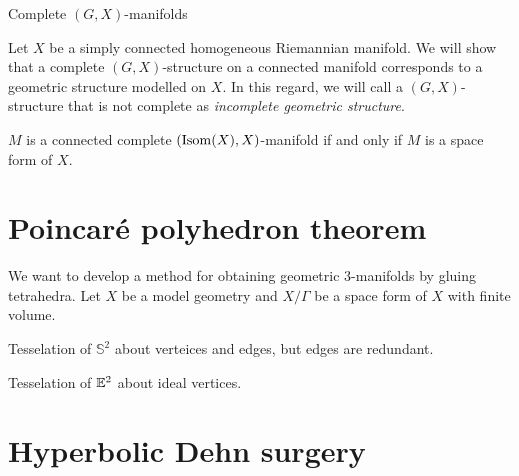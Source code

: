 \documentclass{../../large}
\begin{document}
\begin{prb}
Complete $(G,X)$-manifolds
\end{prb}

\begin{prb}
Let $X$ be a simply connected homogeneous Riemannian manifold.
We will show that a complete $(G,X)$-structure on a connected manifold corresponds to a geometric structure modelled on $X$.
In this regard, we will call a $(G,X)$-structure that is not complete as \emph{incomplete geometric structure}.
\begin{parts}
\item $M$ is a connected complete $(\operatorname{Isom}(X),X)$-manifold if and only if $M$ is a space form of $X$.
\end{parts}
\end{prb}



\section{Poincar\'e polyhedron theorem}

\begin{prb}
\end{prb}

\begin{prb}
We want to develop a method for obtaining geometric 3-manifolds by gluing tetrahedra.
Let $X$ be a model geometry and $X/\Gamma$ be a space form of $X$ with finite volume.
\end{prb}

\begin{prb}
Tesselation of $\mathbb{S}^2$ about verteices and edges, but edges are redundant.
\end{prb}

\begin{prb}
Tesselation of $\mathbb{E}^2$ about ideal vertices.

\end{prb}



\section{Hyperbolic Dehn surgery}



\begin{prb}
\end{prb}
\end{document}
